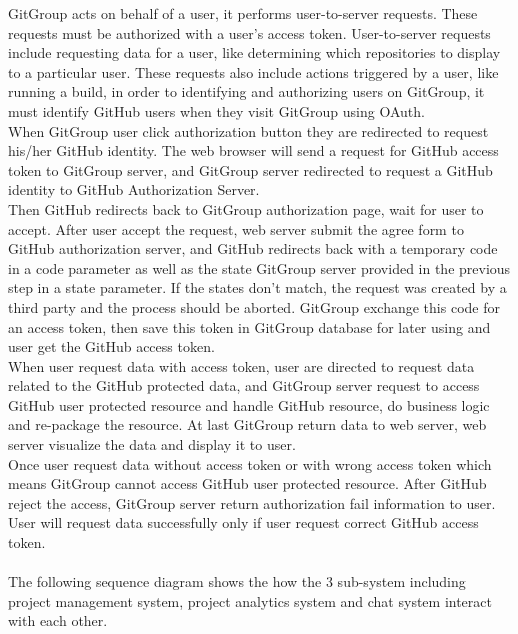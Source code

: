 \documentclass[12pt,a4paper]{report}
\begin{document}
GitGroup acts on behalf of a user, it performs user-to-server requests. These requests must be authorized with a user's access token. User-to-server requests include requesting data for a user, like determining which repositories to display to a particular user. These requests also include actions triggered by a user, like running a build, in order to identifying and authorizing users on GitGroup, it must identify GitHub users when they visit GitGroup using OAuth.\\
When GitGroup user click authorization button they are redirected to request his/her GitHub identity. The web browser will send a request for GitHub access token to GitGroup server, and GitGroup server redirected to request a GitHub identity to GitHub Authorization Server. \\
Then GitHub redirects back to GitGroup authorization page, wait for user to accept. After user accept the request, web server submit the agree form to GitHub authorization server, and GitHub redirects back with a temporary code in a code parameter as well as the state GitGroup server provided in the previous step in a state parameter. If the states don't match, the request was created by a third party and the process should be aborted. GitGroup exchange this code for an access token, then save this token in GitGroup database for later using and user get the GitHub access token. \\
When user request data with access token, user are directed to request data related to the GitHub protected data, and GitGroup server request to access GitHub user protected resource and handle GitHub resource, do business logic and re-package the resource. At last GitGroup return data to web server, web server visualize the data and display it to user.\\
Once user request data without access token or with wrong access token which means GitGroup cannot access GitHub user protected resource. After GitHub reject the access, GitGroup server return authorization fail information to user. User will request data successfully only if user request correct GitHub access token.\\
\\
The following sequence diagram shows the how the 3 sub-system including project management system, project analytics system and chat system interact with each other.
\end{document}
